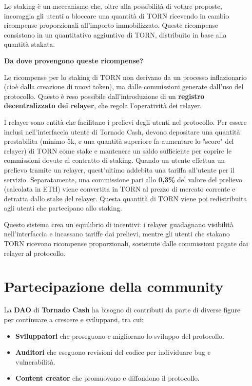 Lo staking è un meccanismo che, oltre alla possibilità di votare proposte, incoraggia gli utenti a bloccare una quantità di TORN ricevendo in cambio ricompense proporzionali all'importo immobilizzato. Queste ricompense consistono in un quantitativo aggiuntivo di TORN, distribuito in base alla quantità stakata.

\textbf{Da dove provengono queste ricompense?}

Le ricompense per lo staking di TORN non derivano da un processo inflazionario (cioè dalla creazione di nuovi token), ma dalle commissioni generate dall'uso del protocollo. Questo è reso possibile dall'introduzione di un \textbf{registro decentralizzato dei relayer}, che regola l'operatività dei relayer.

I relayer sono entità che facilitano i prelievi degli utenti nel protocollo. Per essere inclusi nell'interfaccia utente di Tornado Cash, devono depositare una quantità prestabilita (minimo 5k, e una quantità superiore fa aumentare lo "score" del relayer) di TORN come stake e mantenere un saldo sufficiente per coprire le commissioni dovute al contratto di staking. Quando un utente effettua un prelievo tramite un relayer, quest'ultimo addebita una tariffa all'utente per il servizio. Separatamente, una commissione pari allo \textbf{0,3\%} del valore del prelievo (calcolata in ETH) viene convertita in TORN al prezzo di mercato corrente e detratta dallo stake del relayer. Questa quantità di TORN viene poi redistribuita agli utenti che partecipano allo staking.

Questo sistema crea un equilibrio di incentivi: i relayer guadagnano visibilità nell'interfaccia e incassano tariffe dai prelievi, mentre gli utenti che stakano TORN ricevono ricompense proporzionali, sostenute dalle commissioni pagate dai relayer al protocollo.


\section{Partecipazione della community}

La \textbf{DAO} di \textbf{Tornado Cash} ha bisogno di contributi da parte di diverse figure per continuare a crescere e svilupparsi, tra cui:

\begin{itemize}
    \item \textbf{Sviluppatori} che proseguono e migliorano lo sviluppo del protocollo.
    \item \textbf{Auditori} che eseguono revisioni del codice per individuare bug e vulnerabilità.
    \item \textbf{Content creator} che promuovono e diffondono il protocollo.
\end{itemize}

